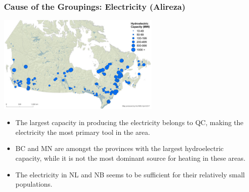 \documentclass{beamer}
\begin{document}
\begin{frame}
\frametitle{Cause of the Groupings: Electricity (Alireza)}
\begin{center}
\includegraphics[width=0.6\textwidth]{hydroPower.jpg}
\small
\end{center}
\begin{itemize}
	\item The largest capacity in producing the electricity belongs to QC, making the electricity the most primary tool in the area.
	\item BC and MN are amongst the provinces with the largest hydroelectric capacity, while it is not the most dominant source for heating in these areas.
	\item The electricity in NL and NB seems to be sufficient for their relatively small populations.
\end{itemize}
\normalsize
\end{frame}
\end{document}
